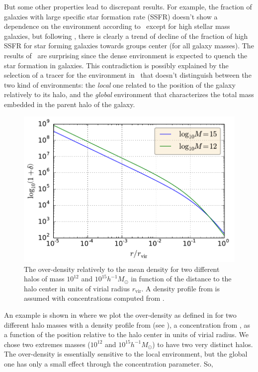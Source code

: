But some other properties lead to discrepant results. For example, the fraction
of galaxies with large specific star formation rate (SSFR) doesn't show a
dependence on the environment according to~\cite{Peng+10} except for high
stellar mass galaxies, but following \citet{vonderLinden+10}, there is clearly
a trend of decline of the fraction of high SSFR for star forming galaxies
towards groups center (for all galaxy masses). The results of~\cite{Peng+10}
are surprising since the dense environment is expected to quench the star
formation in galaxies. This contradiction is possibly explained by the
selection of a tracer for the environment in~\cite{Peng+10} that doesn't
distinguish between the two kind of environments: the \emph{local} one related
to the position of the galaxy relatively to its halo, and the \emph{global}
environment that characterizes the total mass embedded in the parent halo of
the galaxy.
%
\begin{figure}[htb]
    \centering
    \includegraphics[width=0.6\linewidth]{figures/introduction/overdensity.pdf}
    \caption{The over-density relatively to the mean density for two different
        halos of mass $10^{12}$ and $10^{15} h^{-1} M_\odot$ in function of the
        distance to the halo center in units of virial radius $r_\mathrm{vir}$.
        A density profile from \citet{NFW+97} is assumed with concentrations
    computed from \citet{Maccio+08}.\label{fig:overdensity}}
\end{figure}
%
An example is shown in  where we plot the
over-density as defined in \citet{Peng+10} for two different halo masses with a
density profile from \citet{NFW+97} (see ), a
concentration from \citet{Maccio+08}, as a function of the position relative to
the halo center in units of virial radius. We chose two extremes masses
($10^{12}$ and $10^{15} h^{-1} M_\odot$) to have two very distinct halos. The
over-density is essentially sensitive to the local environment, but the global
one has only a small effect through the concentration parameter. So,
